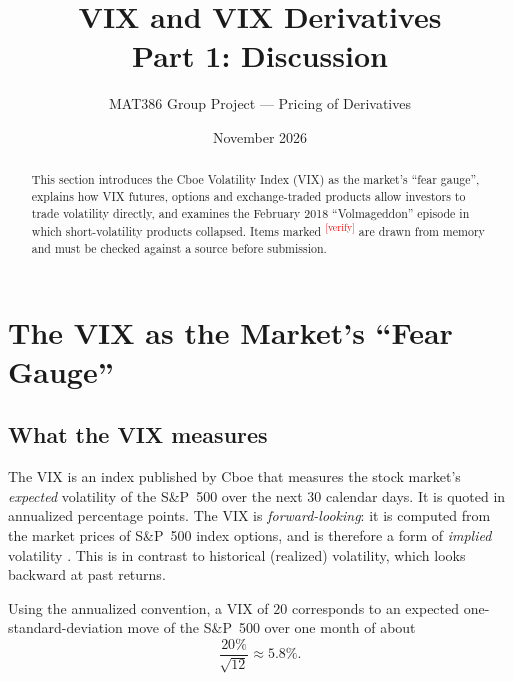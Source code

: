 \documentclass[11pt,a4paper]{article}
\title{VIX and VIX Derivatives\\[2pt]\large Part 1: Discussion}
\author{MAT386 Group Project --- Pricing of Derivatives}
\date{November 2026}
\newcommand{\verify}[1][]{\textcolor{red}{\textsuperscript{[verify#1]}}}
\begin{document}
\maketitle

\begin{abstract}
\noindent
This section introduces the Cboe Volatility Index (VIX) as the market's ``fear gauge'', explains how VIX futures, options and exchange-traded products allow investors to trade volatility directly, and examines the February 2018 ``Volmageddon'' episode in which short-volatility products collapsed. Items marked \verify{} are drawn from memory and must be checked against a source before submission.
\end{abstract}

\tableofcontents
\newpage

\section{The VIX as the Market's ``Fear Gauge''}

\subsection{What the VIX measures}

The VIX is an index published by Cboe that measures the stock market's \emph{expected} volatility of the S\&P~500 over the next 30 calendar days. It is quoted in annualized percentage points. The VIX is \emph{forward-looking}: it is computed from the market prices of S\&P~500 index options, and is therefore a form of \emph{implied} volatility \cite{cboe}. This is in contrast to historical (realized) volatility, which looks backward at past returns. 

Using the annualized convention, a VIX of $20$ corresponds to an expected one-standard-deviation move of the S\&P~500 over one month of about
\begin{equation}
  \frac{20\%}{\sqrt{12}} \approx 5.8\%.
\end{equation}
\end{document}
